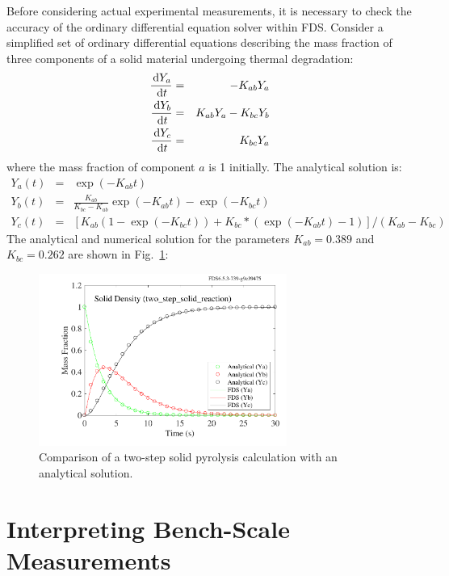 \documentclass[11pt]{book}
\begin{document}
Before considering actual experimental measurements, it is necessary to check the accuracy of the ordinary differential
equation solver within FDS. Consider a simplified set  of ordinary  differential equations  describing the mass
fraction of three components of a solid material  undergoing thermal degradation:
\begin{eqnarray}
    \frac{\,\mathrm{d} Y_a}{\,\mathrm{d} t} &=&  -K_{ab} Y_a \nonumber  \\
    \frac{\,\mathrm{d} Y_b}{\,\mathrm{d} t} &=&   K_{ab} Y_a  -  K_{bc}  Y_b  \\
    \frac{\,\mathrm{d} Y_c}{\,\mathrm{d} t} &=&   K_{bc} Y_a
    \nonumber
\end{eqnarray}
where  the  mass  fraction  of  component  $a$  is  1  initially.  The
analytical solution is:
\begin{eqnarray}
    Y_a(t)    &=&    \exp(-K_{ab}t)    \nonumber   \\
    Y_b(t)    &=&    \frac{K_{ab}}{K_{bc}-K_{ab}} \exp(-K_{ab} t)  - \exp(-K_{bc} t) \\
    Y_c(t)    &=&    \left[   K_{ab}    (1-\exp(-K_{bc} t) )    +  K_{bc}*(\exp(-K_{ab} t) -1) \right] / (K_{ab}-K_{bc})
\end{eqnarray}
The analytical and  numerical solution for the parameters $K_{ab} = 0.389$ and $K_{bc} = 0.262$ are shown in Fig.~\ref{fig:two_step_solid_reaction}:

\begin{figure}[!htb]
\centering
\includegraphics[width=3.2in]{SCRIPT_FIGURES/two_step_solid_reaction}
\caption[The  test case]{Comparison of a two-step solid pyrolysis calculation with an analytical solution.}
\label{fig:two_step_solid_reaction}
\end{figure}


\clearpage


\section{Interpreting Bench-Scale Measurements}
\label{solid_kinetics}
\end{document}
